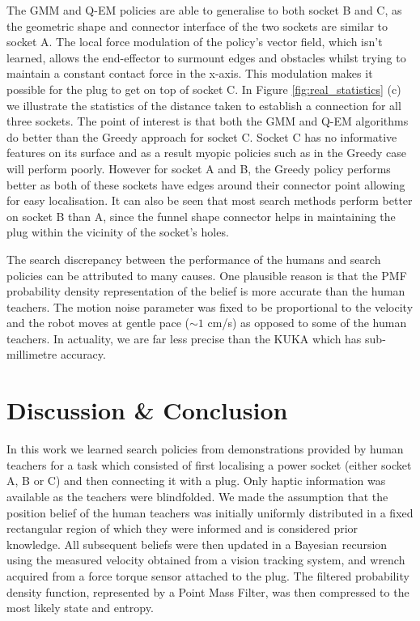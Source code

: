 The GMM and Q-EM policies are able to generalise to both socket B and C, as the geometric shape and connector interface of the 
two sockets are similar to socket A. The local force modulation of the policy's vector field, which isn't learned, allows the 
end-effector to surmount edges and obstacles whilst trying to maintain a constant contact force in the x-axis. This modulation makes it possible for the plug to get on top of socket C.
In Figure \ref{fig:real_statistics} (c) we illustrate the statistics of the distance taken to establish a connection for all three sockets. 
The point of interest is that both the GMM and Q-EM algorithms do better than the Greedy approach for socket C. Socket C has no informative 
features on its surface and as a result myopic policies such as in the Greedy case will perform poorly. However for socket A 
and B, the Greedy policy performs better as both of these sockets have edges around their connector point allowing for easy localisation. 
It can also be seen that most search methods perform better on socket B than A, since the funnel shape connector helps in maintaining the plug 
within the vicinity of the socket's holes. 


The search discrepancy between the performance of the humans and search policies can be attributed to many causes. One plausible reason is 
that the PMF probability density representation of the belief is more accurate than the human teachers. 
The motion noise parameter was fixed to be proportional to the velocity and the robot moves at gentle pace ($\sim1$ cm/s) as 
opposed to some of the human teachers. In actuality, we are far less precise than the KUKA which has sub-millimetre accuracy.

\section{Discussion \& Conclusion}\label{ch4:conclusion}
%
%
%

In this work we learned search policies from demonstrations provided by human teachers for a task
which consisted of first localising a power socket (either socket A, B or C) and then connecting it with a plug. Only haptic information 
was available as the teachers were blindfolded. We made the assumption that the position belief of the human teachers 
was initially uniformly distributed in a fixed rectangular region of which they were 
informed and is considered prior knowledge. All subsequent beliefs were then updated in a Bayesian recursion 
using the measured velocity obtained from a vision tracking system, and wrench acquired from a force torque sensor attached 
to the plug. The filtered probability density function, represented by a Point Mass Filter, was then compressed to the 
most likely state and entropy.

